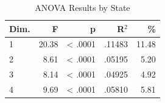 \begin{table}[H]
  \centering
  \caption{ANOVA Results by State}
  \label{tab:anova_state}
  \begin{tabular}{l r r r r}
    Dim. & F & p & R$^2$ & \% \\
    \hline
    1 & 20.38 & < .0001 & .11483 & 11.48 \\
    2 & 8.61 & < .0001 & .05195 & 5.20 \\
    3 & 8.14 & < .0001 & .04925 & 4.92 \\
    4 & 9.69 & < .0001 & .05810 & 5.81 \\
  \end{tabular}
\end{table}
